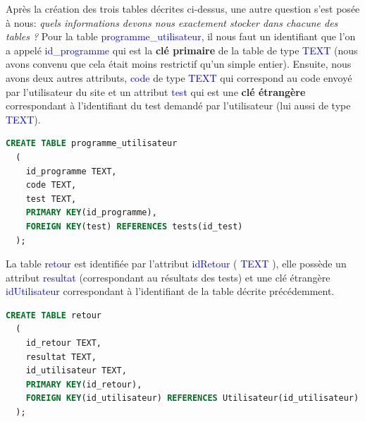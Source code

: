 \documentclass[a4paper]{article}
\renewcommand{\texttt}[2][blue]{\textcolor{#1}{\ttfamily #2}}
\begin{document}
  Après la création des trois tables décrites ci-dessus, une autre question
  s'est posée à nous: \textit{quels informations devons nous exactement stocker
  dans chacune des tables ?} Pour la table \texttt{programme\_utilisateur}, il
  nous faut un identifiant que l'on a appelé \texttt{id\_programme} qui est la
  \textbf{clé primaire} de la table de type \texttt{TEXT} (nous avons convenu
  que cela était moins restrictif qu'un simple entier). Ensuite, nous avons
  deux autres attributs, \texttt{code} de type \texttt{TEXT} qui correspond au
  code envoyé par l'utilisateur du site et un attribut \texttt{test} qui est
  une \textbf{clé étrangère} correspondant à l'identifiant du test demandé par
  l'utilisateur (lui aussi de type \texttt{TEXT}).

  \begin{lstlisting}[language=SQL]
  CREATE TABLE programme_utilisateur
  (
    id_programme TEXT,
    code TEXT,
    test TEXT,
    PRIMARY KEY(id_programme),
    FOREIGN KEY(test) REFERENCES tests(id_test)
  );
  \end{lstlisting}

  La table \texttt{retour} est identifiée par l'attribut \texttt{idRetour} (
  \texttt{TEXT} ), elle possède un attribut \texttt{resultat} (correspondant au
  résultats des tests) et une clé étrangère \texttt{idUtilisateur}
  correspondant à l'identifiant de la table décrite précédemment.

  \begin{lstlisting}[language=SQL]
  CREATE TABLE retour
  (
    id_retour TEXT,
    resultat TEXT,
    id_utilisateur TEXT,
    PRIMARY KEY(id_retour),
    FOREIGN KEY(id_utilisateur) REFERENCES Utilisateur(id_utilisateur)
  );
  \end{lstlisting}
\end{document}

